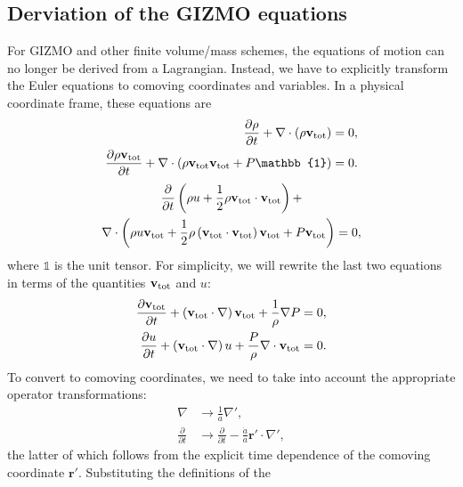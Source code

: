 \subsection{Derviation of the GIZMO equations}

For GIZMO and other finite volume/mass schemes, the equations of motion can no
longer be derived from a Lagrangian. Instead, we have to explicitly transform
the Euler equations to comoving coordinates and variables. In a physical
coordinate frame, these equations are
\begin{align}
\frac{\partial{}\rho{}}{\partial{}t} +
\nabla{} \cdot \left(\rho{} \mathbf{v}_{\rm tot} \right)
&= 0, \\
\frac{\partial{} \rho{} \mathbf{v}_{\rm tot} }{\partial{} t} +
\nabla{} \cdot \left( \rho{} \mathbf{v}_{\rm tot} \mathbf{v}_{\rm tot} +
P \mathbb{1} \right) &= 0.
\end{align}
\begin{multline}
\frac{\partial{}}{\partial{} t} \left( \rho{} u + \frac{1}{2} \rho{}
\mathbf{v}_{\rm{} tot}\cdot\mathbf{v}_{\rm{} tot} \right) +\\
\nabla{} \cdot \left( \rho{} u \mathbf{v}_{\rm{} tot} +
\frac{1}{2} \rho{} \left(\mathbf{v}_{\rm{} tot} \cdot \mathbf{v}_{\rm{} tot}\right)
\mathbf{v}_{\rm{} tot} + P \mathbf{v}_{\rm{} tot} \right) = 0,
\end{multline}
where $\mathbb{1}$ is the unit tensor.
For simplicity, we will rewrite the last two equations in terms of the quantities
$\mathbf{v}_{\rm{} tot}$ and $u$:
\begin{align}
\frac{\partial{} \mathbf{v}_{\rm{} tot}}{\partial{} t} +
\left(\mathbf{v}_{\rm{} tot} \cdot \nabla{} \right) \mathbf{v}_{\rm{} tot} +
\frac{1}{\rho{}}\nabla{} P &= 0,\\
\frac{\partial{} u}{\partial{} t} +
\left(\mathbf{v}_{\rm{} tot} \cdot \nabla{} \right) u +
\frac{P}{\rho{}} \nabla{} \cdot \mathbf{v}_{\rm{} tot} &= 0.
\end{align}
To convert to comoving coordinates, we need to take into account the
appropriate operator transformations:
\begin{align}
\nabla{} &\rightarrow{} \frac{1}{a} \nabla{}', \\
\frac{\partial{}}{\partial{} t} &\rightarrow{}
\frac{\partial{}}{\partial{} t} - \frac{\dot{a}}{a} \mathbf{r}' \cdot \nabla{}',
\end{align}
the latter of which follows from the explicit time dependence of the
comoving coordinate $\mathbf{r}'$. Substituting the definitions of the

